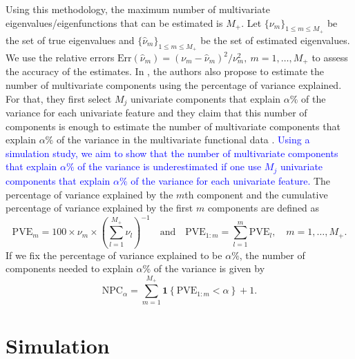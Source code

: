 Using this methodology, the maximum number of multivariate eigenvalues/eigenfunctions that can be estimated is $M_+$. Let $\{\nu_m\}_{1 \leq m \leq M_+}$ be the set of true eigenvalues and $\{\widehat{\nu}_m\}_{1 \leq m \leq M_+}$ be the set of estimated eigenvalues. We use the relative errors $\text{Err}(\widehat{\nu}_m)  = (\nu_m - \widehat{\nu}_m)^2 / \nu^2_m,~m = 1, \ldots, M_+$ to assess the accuracy of the estimates. In \cite{happMultivariateFunctionalPrincipal2018}, the authors also propose to estimate the number of multivariate components using the percentage of variance explained. For that, they first select $M_j$ univariate components that explain $\alpha\%$ of the variance for each univariate feature \cite[Chapter 8.2]{ramsayFunctionalDataAnalysis2005} and they claim that this number of components is enough to estimate the number of multivariate components that explain $\alpha\%$ of the variance in the multivariate functional data \cite[Section 3.2]{happMultivariateFunctionalPrincipal2018}. \textcolor{blue}{Using a simulation study, we aim to show that the number of multivariate components that explain $\alpha\%$ of the variance is underestimated if one use $M_j$ univariate components that explain $\alpha\%$ of the variance for each univariate feature.} The percentage of variance explained by the $m$th component and the cumulative percentage of variance explained by the first $m$ components are defined as
\begin{equation}\label{eq:pve}
     \text{PVE}_m = 100 \times \nu_m \times \left(\sum_{l = 1}^{M_+} \nu_l\right)^{-1} \quad\text{and}\quad \text{PVE}_{1:m} = \sum_{l = 1}^m \text{PVE}_l, \quad m = 1, \dots, M_+.
\end{equation}
If we fix the percentage of variance explained to be $\alpha\%$, the number of components needed to explain $\alpha\%$ of the variance is given by
\begin{equation}\label{eq:npc}
     \text{NPC}_{\alpha} = \sum_{m = 1}^{M_{+}} \mathbf{1}\left\{\text{PVE}_{1:m} < \alpha\right\} + 1.
\end{equation}



\section{Simulation} %
\label{sec:simulation}

